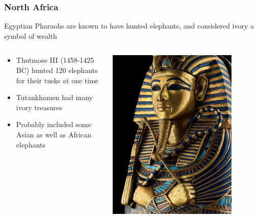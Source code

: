 \documentclass[10pt]{beamer}
\begin{document}
\begin{frame}[t]
\frametitle{North Africa}
\vspace{0.5cm}
		
	Egyptian Pharaohs are known to have hunted elephants, and considered ivory a symbol of wealth
	
	\vspace{0.25cm}
	
	\begin{columns}
		\begin{column}{0.7\textwidth}
			\begin{itemize}
				\item Thutmose III (1458-1425 BC) hunted 120 elephants for their tusks at one time
				\medskip
				\item Tutankhamen had many ivory treasures
				\medskip
				\item Probably included some Asian as well as African elephants 
			\end{itemize}
		\end{column}
		
		\begin{column}{0.3\textwidth}
			\begin{center}
				\includegraphics[width=0.8\textwidth]{figures/pharaoh.jpg}
			\end{center}
		\end{column}
	\end{columns}
\end{frame}
\end{document}
